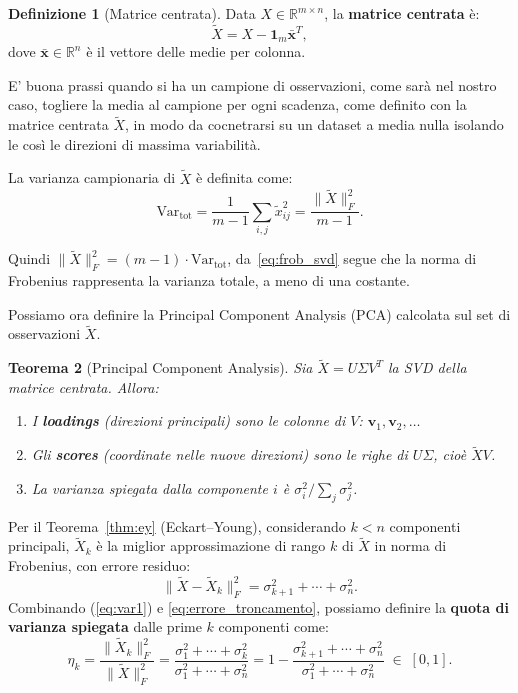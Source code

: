 \documentclass[11pt,a4paper]{article}
\theoremstyle{plain}
\newtheorem{teorema}{Teorema}[section]
\theoremstyle{definition}
\newtheorem{definizione}[teorema]{Definizione}
\theoremstyle{remark}
\begin{document}
\begin{definizione}[Matrice centrata]
\label{def:matrice_centrata}
Data $X \in \mathbb{R}^{m \times n}$,
la \textbf{matrice centrata} è:
\[
  \tilde{X} = X - \mathbf{1}_m \bar{\mathbf{x}}^T,
\]
dove $\bar{\mathbf{x}} \in \mathbb{R}^n$ è il vettore delle medie per colonna.
\end{definizione}

E' buona prassi quando si ha un campione di osservazioni, come sarà nel nostro caso, 
togliere la media al campione per ogni scadenza, 
come definito con la matrice centrata $\tilde{X}$, 
in modo da  cocnetrarsi su un dataset a media nulla isolando le così le direzioni di massima variabilità. 

La varianza campionaria di $\tilde{X}$ è definita come:
\begin{equation}
      \text{Var}_{\text{tot}} = \frac{1}{m-1} \sum_{i,j} \tilde{x}_{ij}^2
  = \frac{\|\tilde{X}\|_F^2}{m-1}. \label{eq:var1}
\end{equation}


Quindi $\|\tilde{X}\|_F^2 = (m{-}1) \cdot \text{Var}_{\text{tot}}$, da~\eqref{eq:frob_svd} segue che la norma di
Frobenius rappresenta la varianza totale, a meno di una costante.

Possiamo ora definire la Principal Component Analysis (PCA) calcolata sul set di osservazioni $\tilde{X}$.

\begin{teorema}[Principal Component Analysis]
\label{thm:pca}
Sia $\tilde{X} = U \Sigma V^T$ la SVD della matrice centrata. Allora:
\begin{enumerate}
  \item I \textbf{loadings} (direzioni principali) sono le colonne di $V$:
        $\mathbf{v}_1, \mathbf{v}_2, \ldots$
  \item Gli \textbf{scores} (coordinate nelle nuove direzioni) sono le righe
        di $U\Sigma$, cioè $\tilde{X} V$.
  \item La varianza spiegata dalla componente $i$ è
        $\sigma_i^2 / \sum_j \sigma_j^2$.
\end{enumerate}
\end{teorema}

Per il Teorema~\ref{thm:ey} (Eckart--Young), considerando $k < n$ componenti
principali, $\tilde{X}_k$ è la miglior approssimazione di rango $k$ di $\tilde{X}$
in norma di Frobenius, con errore residuo:
\begin{equation}
  \|\tilde{X} - \tilde{X}_k\|_F^2
  = \sigma_{k+1}^2 + \cdots + \sigma_n^2.
  \label{eq:errore_troncamento}
\end{equation}
Combinando (\ref{eq:var1}) e \eqref{eq:errore_troncamento}, possiamo definire la \textbf{quota di
varianza spiegata} dalle prime $k$ componenti come:
\begin{equation}
  \eta_k
  = \frac{\|\tilde{X}_k\|_F^2}{\|\tilde{X}\|_F^2}
  = \frac{\sigma_1^2 + \cdots + \sigma_k^2}{\sigma_1^2 + \cdots + \sigma_n^2}
  = 1 - \frac{\sigma_{k+1}^2 + \cdots + \sigma_n^2}{\sigma_1^2 + \cdots + \sigma_n^2}
  \;\in\; [0,1].
  \label{eq:varianza_spiegata}
\end{equation}
\end{document}
